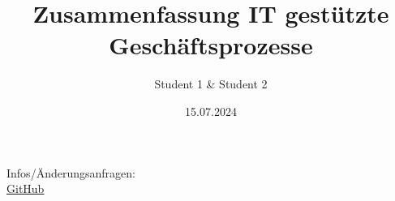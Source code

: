 \documentclass[a4paper,12pt]{article}
\title{Zusammenfassung IT gestützte Geschäftsprozesse}
\author{Student 1 \& Student 2}
\date{15.07.2024}
\begin{document}
\raggedright

\maketitle
\begin{center}
    {\Large Infos/Änderungsanfragen:} \\[1cm]
    \href{https://github.com/gerritniklas/Zusammenfassung-IT-Geschaeftsprozesse}{GitHub}
\end{center}

\newpage

\tableofcontents

\newpage























\end{document}
